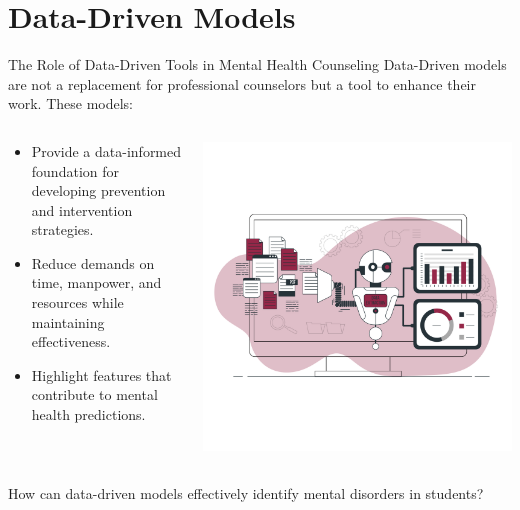 \documentclass[10pt, xcolor=table]{beamer}
\let\olditem\item
\renewcommand\item{\olditem\justifying}
\begin{document}
	
\section*{Data-Driven Models}


	\begin{frame}{The Role of Data-Driven Tools in Mental Health Counseling}
	\vspace{-0.5cm}
	\justifying
	Data-Driven models are not a replacement for professional counselors but a tool to enhance their work. These models:
	\vspace{-1.0cm}
	\begin{columns}
	\begin{column}{0.5\textwidth}
	\begin{itemize}
		\item Provide a data-informed foundation for developing prevention and intervention strategies.
		\item Reduce demands on time, manpower, and resources while maintaining effectiveness.
		\item Highlight features that contribute to mental health predictions.
	\end{itemize}
	\end{column}
	
	\begin{column}{0.5\textwidth}
		\centering
		\includegraphics[width=\linewidth]{./figures/data_driven.png}
			
		\end{column}
\end{columns}

 \justifying
How can data-driven models effectively identify mental disorders in students? \cite{DEHGHANBONARI2023100238}
	
\end{frame}
	
\end{document}
